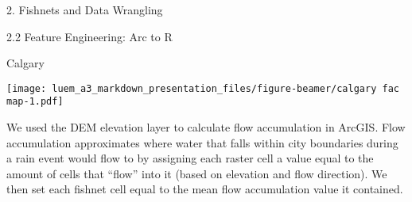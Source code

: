 \documentclass[
  ignorenonframetext,
]{beamer}
\newenvironment{Shaded}{\begin{snugshade}}{\end{snugshade}}
\newcommand{\AttributeTok}[1]{\textcolor[rgb]{0.77,0.63,0.00}{#1}}
\newcommand{\ConstantTok}[1]{\textcolor[rgb]{0.00,0.00,0.00}{#1}}
\newcommand{\DecValTok}[1]{\textcolor[rgb]{0.00,0.00,0.81}{#1}}
\newcommand{\FloatTok}[1]{\textcolor[rgb]{0.00,0.00,0.81}{#1}}
\newcommand{\FunctionTok}[1]{\textcolor[rgb]{0.00,0.00,0.00}{#1}}
\newcommand{\NormalTok}[1]{#1}
\newcommand{\SpecialCharTok}[1]{\textcolor[rgb]{0.00,0.00,0.00}{#1}}
\newcommand{\StringTok}[1]{\textcolor[rgb]{0.31,0.60,0.02}{#1}}
\begin{document}
\begin{frame}[fragile]{2. Fishnets and Data Wrangling}
\begin{block}{2.2 Feature Engineering: Arc to R}
\begin{block}{Calgary}
\begin{Shaded}
\end{Shaded}

\texttt{[image: luem\_a3\_markdown\_presentation\_files/figure-beamer/calgary fac map-1.pdf]}

We used the DEM elevation layer to calculate flow accumulation in
ArcGIS. Flow accumulation approximates where water that falls within
city boundaries during a rain event would flow to by assigning each
raster cell a value equal to the amount of cells that ``flow'' into it
(based on elevation and flow direction). We then set each fishnet cell
equal to the mean flow accumulation value it contained.


\end{block}
\end{block}
\end{frame}
\end{document}

